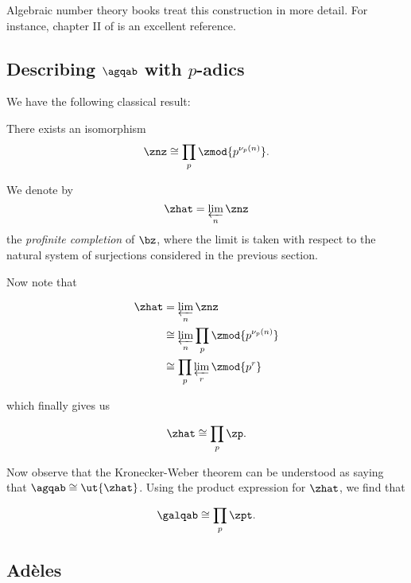 Algebraic number theory books treat this construction in more detail. For
instance, chapter II of \cite{neukirch} is an excellent reference.

\subsection{Describing $\agqab$ with $p$-adics}

We have the following classical result:

\begin{thm}
  There exists an isomorphism
  \[ \znz \cong \prod_p \zmod {p^{\nu_p(n)}}. \]
\end{thm}

\begin{defn}
  We denote by
  \[ \zhat = \varprojlim_n \znz \]
  the \textit{profinite completion} of $\bz$, where the limit is taken with
  respect to the natural system of surjections considered in the previous section.
\end{defn}

Now note that

\begin{align*}
  \zhat &= \varprojlim_n \znz \\
        &\cong \varprojlim_n \prod_p \zmod {p^{\nu_p(n)}} \\
        &\cong \prod_p \varprojlim_r \zmod {p^r}
\end{align*}

which finally gives us

\[ \zhat \cong \prod_p \zp. \]

Now observe that the Kronecker-Weber theorem can be understood as saying that
$\agqab \cong \ut{\zhat}$. Using the product expression for $\zhat$, we find
that

\[ \galqab \cong \prod_p \zpt. \]



\subsection{Ad\`eles }
\label{sec:adeles}

